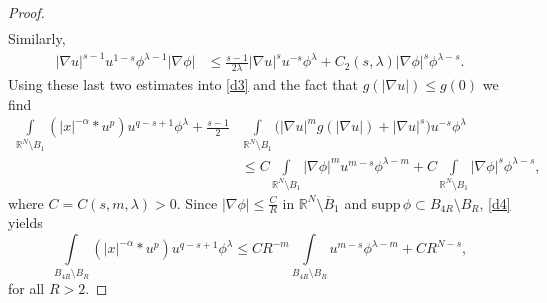 \documentclass[10pt,a4paper]{amsart}
\numberwithin{equation}{section}
\newcommand{\R}{\mathbb R}
\newcommand{\Ro}{\mathbb R^N\setminus \overline B_1}
\begin{document}
\begin{proof}
$$\begin{aligned}
\end{aligned}
$$
Similarly,
$$
\begin{aligned}
|\nabla u|^{s-1}u^{1-s}\phi^{\lambda-1}|\nabla \phi|&\leq \frac{s-1}{2\lambda}|\nabla u|^{s} u^{-s}\phi^\lambda+C_2(s,\lambda)|\nabla \phi|^{s}\phi^{\lambda-s}.
\end{aligned}
$$
Using these last two estimates into \eqref{d3} and the fact that $g(|\nabla u|)\leq g(0)$ we find
\begin{equation}\label{d4}
\begin{aligned}
\int\limits_{\R^N\setminus B_1}(|x|^{-\alpha}*u^p) u^{q-s+1}\phi^\lambda+\frac{s-1}{2} & \int\limits_{\R^N\setminus B_1}\Big(|\nabla u|^{m}g(|\nabla u|)+|\nabla u|^{s}\Big) u^{-s}\phi^\lambda\\
&\leq C\int\limits_{\R^N\setminus B_1} |\nabla \phi|^{m} u^{m-s}\phi^{\lambda-m} +C\int\limits_{\R^N\setminus B_1}  |\nabla \phi|^{s}\phi^{\lambda-s},
\end{aligned}
\end{equation}
where $C=C(s, m, \lambda)>0$. Since $|\nabla \phi|\leq \frac{C}{R}$ in $\Ro$ and supp$\,\phi\subset B_{4R}\setminus B_{R}$, \eqref{d4} yields
\begin{equation}\label{d5}
\int\limits_{B_{4R}\setminus B_R}(|x|^{-\alpha}*u^p) u^{q-s+1}\phi^\lambda \leq CR^{-m}\int\limits_{B_{4R}\setminus B_R} u^{m-s}\phi^{\lambda-m} +CR^{N-s},
\end{equation}
for all $R>2$. 


\end{proof}
\end{document}
